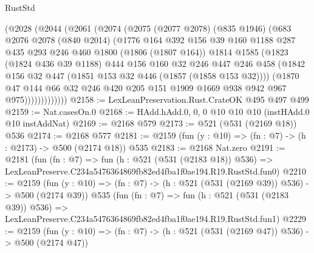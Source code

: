 \begin{lexlean}{RustStd}
\begin{coremodule}
            (@2028
              (@2044
                (@2061
                  (@2074
                    (@2075
                      (@2077 @2078)
                      (@835 @1946)
                      (@683
                        @2076
                        @2078
                        (@840 @2014)
                        (@1776
                          @164
                          @392
                          @156
                          @39
                          @160
                          @1188
                          @287
                          @435
                          @293
                          @246
                          @460
                          @1800
                          (@1806 (@1807 @164))
                          @1814
                          @1585
                          (@1823
                            (@1824 @436 @39 @1188)
                            @444
                            @156
                            @160
                            @32
                            @246
                            @447
                            @246
                            @458
                            (@1842 @156 @32 @447 (@1851 @153 @32 @446 (@1857 (@1858 @153 @32))))
                            (@1870
                              @47
                              @144
                              @66
                              @32
                              @246
                              @420
                              @205
                              @151
                              @1909
                              @1669
                              @938
                              @942
                              @967
                              @975)))))))))))))
@2158 := LexLeanPreservation.Rust.CrateOK @495 @497 @499
@2159 := Nat.casesOn.{0}
@2168 := HAdd.hAdd.{0, 0, 0} @10 @10 @10 (instHAdd.{0} @10 instAddNat)
@2169 := @2168 @579
@2173 := @521 (@531 (@2169 @18)) @536
@2174 := @2168 @577
@2181 := @2159 (fun (y : @10) => (fn : @7) -> (h : @2173) -> @500 (@2174 @18)) @535
@2183 := @2168 Nat.zero
@2191 := @2181
    (fun (fn : @7) =>
    fun (h : @521 (@531 (@2183 @18)) @536) =>
    LexLeanPreserve.C234a5476364869fb82ed4fba1f0ae194.R19.RustStd.fun0)
@2210 := @2159
    (fun (y : @10) => (fn : @7) -> (h : @521 (@531 (@2169 @39)) @536) -> @500 (@2174 @39))
    @535
    (fun (fn : @7) =>
    fun (h : @521 (@531 (@2183 @39)) @536) =>
    LexLeanPreserve.C234a5476364869fb82ed4fba1f0ae194.R19.RustStd.fun1)
@2229 := @2159
    (fun (y : @10) => (fn : @7) -> (h : @521 (@531 (@2169 @47)) @536) -> @500 (@2174 @47))

\end{coremodule}
\end{lexlean}
